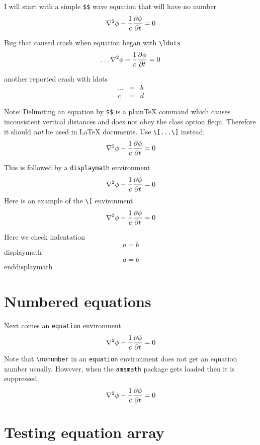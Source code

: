 \documentclass{article}
\begin{document}
I will start with a simple \verb#$$# wave equation
that will have no number
$$
\nabla^2 \phi -{1\over c} {\partial \phi\over \partial t}  = 0
$$

Bug that caused crash when equation began with \verb#\ldots#
$$
\ldots\nabla^2 \phi -{1\over c} {\partial \phi\over \partial t}  = 0
$$

another reported crash with ldots
\begin{eqnarray*} 
\ldots & = & b \\
c      & = & d
\end{eqnarray*} 

Note: Delimiting an equation by \verb|$$| is a plain\TeX{} command
which causes inconsistent vertical distances and does not obey
the class option \textsf{fleqn}.
Therefore it should \emph{not} be used in \LaTeX{} documents. Use
\verb#\[...\]# instead:
\[
\nabla^2 \phi -{1\over c} {\partial \phi\over \partial t}  = 0
\]


This is followed by a \verb#displaymath# environment
\begin{displaymath}
\nabla^2 \phi -{1\over c} {\partial \phi\over \partial t}  = 0
\end{displaymath}
Here is an example of the \verb#\[# environment
\[
\nabla^2 \phi -{1\over c} {\partial \phi\over \partial t}  = 0
\]

\noindent 
Here we check indentation
\[ 
a=b 
\] 
displaymath 
\begin{displaymath} 
a=b 
\end{displaymath} 
enddisplaymath 


\section{Numbered equations}
Next comes an \verb#equation# environment
\begin{equation}
\nabla^2 \phi -{1\over c} {\partial \phi\over \partial t}  = 0
\end{equation}
Note that \verb#\nonumber# in an \verb#equation# environment does not get
an equation number usually.  However, when the \verb#amsmath# package gets
loaded then it is suppressed,
\begin{equation}
\nabla^2 \phi -{1\over c} {\partial \phi\over \partial t}  = 0 \nonumber
\end{equation}

\section{Testing equation array}
\end{document}
